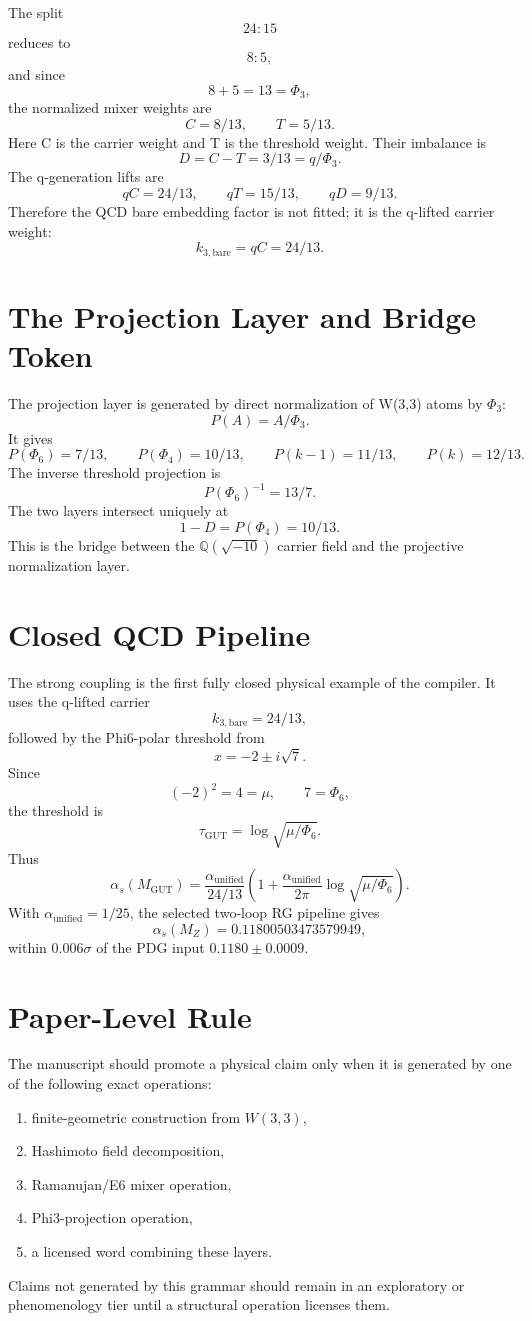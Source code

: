 The split
\[
24:15
\]
reduces to
\[
8:5,
\]
and since
\[
8+5=13=\Phi_3,
\]
the normalized mixer weights are
\[
C=8/13, \qquad T=5/13.
\]
Here C is the carrier weight and T is the threshold weight.  Their imbalance is
\[
D=C-T=3/13=q/\Phi_3.
\]
The q-generation lifts are
\[
qC=24/13,
\qquad
qT=15/13,
\qquad
qD=9/13.
\]
Therefore the QCD bare embedding factor is not fitted; it is the q-lifted
carrier weight:
\[
\boxed{k_{3,\mathrm{bare}}=qC=24/13.}
\]

\section{The Projection Layer and Bridge Token}
\label{sec:projection-layer-bridge-insert}

The projection layer is generated by direct normalization of W(3,3) atoms by
\(\Phi_3\):
\[
P(A)=A/\Phi_3.
\]
It gives
\[
P(\Phi_6)=7/13,
\qquad
P(\Phi_4)=10/13,
\qquad
P(k-1)=11/13,
\qquad
P(k)=12/13.
\]
The inverse threshold projection is
\[
P(\Phi_6)^{-1}=13/7.
\]
The two layers intersect uniquely at
\[
\boxed{1-D=P(\Phi_4)=10/13.}
\]
This is the bridge between the \(\mathbb Q(\sqrt{-10})\) carrier field and
the projective normalization layer.

\section{Closed QCD Pipeline}
\label{sec:closed-qcd-pipeline-insert}

The strong coupling is the first fully closed physical example of the compiler.
It uses the q-lifted carrier
\[
k_{3,\mathrm{bare}}=24/13,
\]
followed by the Phi6-polar threshold from
\[
x=-2\pm i\sqrt7.
\]
Since
\[
(-2)^2=4=\mu,
\qquad
7=\Phi_6,
\]
the threshold is
\[
\tau_{\mathrm{GUT}}=\log\sqrt{\mu/\Phi_6}.
\]
Thus
\[
\alpha_s(M_{\mathrm{GUT}})
=
\frac{\alpha_{\mathrm{unified}}}{24/13}
\left(1+\frac{\alpha_{\mathrm{unified}}}{2\pi}\log\sqrt{\mu/\Phi_6}\right).
\]
With \(\alpha_{\mathrm{unified}}=1/25\), the selected two-loop RG pipeline gives
\[
\alpha_s(M_Z)=0.11800503473579949,
\]
within \(0.006\sigma\) of the PDG input \(0.1180\pm0.0009\).

\section{Paper-Level Rule}
\label{sec:paper-level-rule-insert}

The manuscript should promote a physical claim only when it is generated by
one of the following exact operations:
\begin{enumerate}[nosep]
\item finite-geometric construction from \(W(3,3)\),
\item Hashimoto field decomposition,
\item Ramanujan/E6 mixer operation,
\item Phi3-projection operation,
\item a licensed word combining these layers.
\end{enumerate}
Claims not generated by this grammar should remain in an exploratory or
phenomenology tier until a structural operation licenses them.


